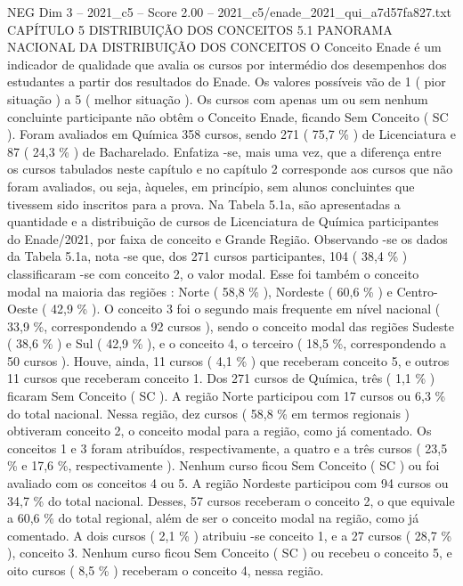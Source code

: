 \begin{textsample}{NEG Dim 3 – 2021\_c5 – Score 2.00 – 2021\_c5/enade\_2021\_qui\_a7d57fa827.txt}  \label{ex:f3_neg_197}
CAPÍTULO 5 DISTRIBUIÇÃO DOS CONCEITOS 5.1 PANORAMA NACIONAL DA DISTRIBUIÇÃO DOS CONCEITOS O Conceito Enade é um indicador de qualidade que avalia os cursos por intermédio dos desempenhos dos estudantes a partir dos resultados do Enade.
Os valores possíveis vão de 1 ( pior situação ) a 5 ( melhor situação ).
Os cursos com apenas um ou sem nenhum concluinte participante não obtêm o Conceito Enade, ficando Sem Conceito ( SC ).
Foram avaliados em Química 358 cursos, sendo 271 ( 75,7 \% ) de Licenciatura e 87 ( 24,3 \% ) de Bacharelado.
Enfatiza -se, mais uma vez, que a diferença entre os cursos tabulados neste capítulo e no capítulo 2 corresponde aos cursos que não foram avaliados, ou seja, àqueles, em princípio, sem alunos concluintes que tivessem sido inscritos para a prova.
Na Tabela 5.1a, são apresentadas a quantidade e a distribuição de cursos de Licenciatura de Química participantes do Enade/2021, por faixa de conceito e Grande Região.
Observando -se os dados da Tabela 5.1a, nota -se que, dos 271 cursos participantes, 104 ( 38,4 \% ) classificaram -se com conceito 2, o valor modal.
Esse foi também o conceito modal na maioria das regiões : Norte ( 58,8 \% ), Nordeste ( 60,6 \% ) e Centro-Oeste ( 42,9 \% ).
O conceito 3 foi o segundo mais frequente em nível nacional ( 33,9 \%, correspondendo a 92 cursos ), sendo o conceito modal das regiões Sudeste ( 38,6 \% ) e Sul ( 42,9 \% ), e o conceito 4, o terceiro ( 18,5 \%, correspondendo a 50 cursos ).
Houve, ainda, 11 cursos ( 4,1 \% ) que receberam conceito 5, e outros 11 cursos que receberam conceito 1.
Dos 271 cursos de Química, três ( 1,1 \% ) ficaram Sem Conceito ( SC ).
A região Norte participou com 17 cursos ou 6,3 \% do total nacional.
Nessa região, dez cursos ( 58,8 \% em termos regionais ) obtiveram conceito 2, o conceito modal para a região, como já comentado.
Os conceitos 1 e 3 foram atribuídos, respectivamente, a quatro e a três cursos ( 23,5 \% e 17,6 \%, respectivamente ).
Nenhum curso ficou Sem Conceito ( SC ) ou foi avaliado com os conceitos 4 ou 5.
A região Nordeste participou com 94 cursos ou 34,7 \% do total nacional.
Desses, 57 cursos receberam o conceito 2, o que equivale a 60,6 \% do total regional, além de ser o conceito modal na região, como já comentado.
A dois cursos ( 2,1 \% ) atribuiu -se conceito 1, e a 27 cursos ( 28,7 \% ), conceito 3.
Nenhum curso ficou Sem Conceito ( SC ) ou recebeu o conceito 5, e oito cursos ( 8,5 \% ) receberam o conceito 4, nessa região.

\end{textsample}
